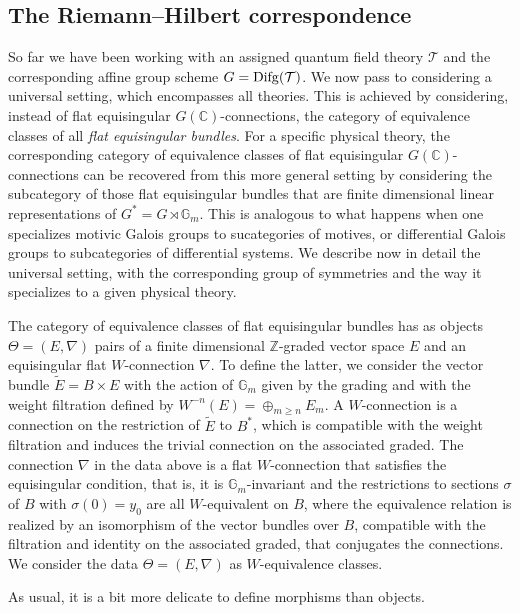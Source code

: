 \documentclass[10pt]{amsart}
\def\C{{\mathbb C}}
\newcommand{\bG}{\mathbb{G}}
\def\Z{{\mathbb Z}}
\def\sT{{\mathcal T}}
\numberwithin{equation}{section}
\begin{document}
\medskip
\subsection*{The Riemann--Hilbert correspondence}\hfill\medskip

So far we have been working with an assigned quantum field theory
$\sT$ and the corresponding affine group scheme $G={\rm
Difg}(\sT)$. We now pass to considering a universal setting, which
encompasses all theories. This is achieved by considering, instead
of flat equisingular $G(\C)$-connections, the category of
equivalence classes of all {\em flat equisingular bundles}. For a
specific physical theory, the corresponding category of
equivalence classes of flat equisingular $G(\C)$-connections can
be recovered from this more general setting by considering the
subcategory of those flat equisingular bundles that are finite
dimensional linear representations of $G^*=G\rtimes \bG_m$. This
is analogous to what happens when one specializes motivic Galois
groups to sucategories of motives, or differential Galois groups
to subcategories of differential systems. We describe now in
detail the universal setting, with the corresponding group of
symmetries and the way it specializes to a given physical theory.

\smallskip

The category of equivalence classes of flat equisingular bundles
has as objects $\Theta=(E,\nabla)$ pairs of a finite dimensional
$\Z$-graded vector space $E$ and an equisingular flat
$W$-connection $\nabla$. To define the latter, we consider the
vector bundle $\tilde{E}=B\times E$ with the action of $\bG_m$
given by the grading and with the weight filtration defined by
$W^{-n}(E)=\oplus_{m\geq n} E_m$. A $W$-connection is a connection
on the restriction of $\tilde E$ to $B^*$, which is compatible
with the weight filtration and induces the trivial connection on
the associated graded. The connection $\nabla$ in the data
above is a flat $W$-connection that satisfies the equisingular
condition, that is, it is $\bG_m$-invariant and the restrictions
to sections $\sigma$ of $B$ with $\sigma(0)=y_0$ are all
$W$-equivalent on $B$, where the equivalence relation is realized
by an isomorphism of the vector bundles over $B$, compatible with
the filtration and identity on the associated graded, that
conjugates the connections. We consider the data
$\Theta=(E,\nabla)$ as $W$-equivalence classes.

\smallskip

As usual, it is a bit more delicate to define morphisms than
objects.
\end{document}
